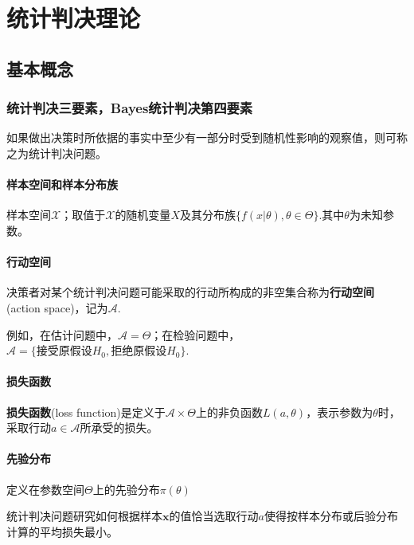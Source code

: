 \documentclass{ctexbook}
\begin{document}
\chapter{统计判决理论}

\section{基本概念}

\subsection{统计判决三要素，Bayes统计判决第四要素}

如果做出决策时所依据的事实中至少有一部分时受到随机性影响的观察值，则可称之为统计判决问题。

\subsubsection{样本空间和样本分布族}

样本空间$\mathcal{X}$；取值于$\mathcal{X}$的随机变量$X$及其分布族$\{f(x|\theta),\theta\in\Theta\}$.其中$\theta$为未知参数。

\subsubsection{行动空间}

决策者对某个统计判决问题可能采取的行动所构成的非空集合称为\textbf{行动空间}(action space)，记为$\mathcal{A}$.

例如，在估计问题中，$\mathcal{A}=\Theta$；在检验问题中，$\mathcal{A}=\{\text{接受原假设}H_0,\text{拒绝原假设}H_0\}$.

\subsubsection{损失函数}

\textbf{损失函数}(loss function)是定义于$\mathcal{A}\times \Theta$上的非负函数$L(a,\theta)$，表示参数为$\theta$时，采取行动$a\in\mathcal{A}$所承受的损失。

\subsubsection{先验分布}

定义在参数空间$\Theta$上的先验分布$\pi(\theta)$

统计判决问题研究如何根据样本$\mathbf{x}$的值恰当选取行动$a$使得按样本分布或后验分布计算的平均损失最小。
\end{document}
